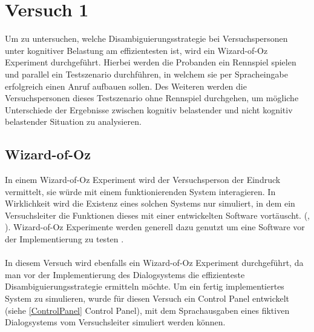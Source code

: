 \documentclass[12pt,a4paper]{scrartcl}
\begin{document}
\section{Versuch 1}
\label{versuch1}
Um zu untersuchen, welche Disambiguierungsstrategie bei Versuchspersonen unter kognitiver Belastung am effizientesten ist, wird ein Wizard-of-Oz Experiment durchgeführt. Hierbei werden die Probanden ein Rennspiel spielen und parallel ein Testszenario durchführen, in welchem sie per Spracheingabe erfolgreich einen Anruf aufbauen sollen. Des Weiteren werden die Versuchspersonen dieses Testszenario ohne Rennspiel durchgehen, um mögliche Unterschiede der Ergebnisse zwischen kognitiv belastender und nicht kognitiv belastender Situation zu analysieren. 
\subsection{Wizard-of-Oz}
\label{WOZ}
In einem Wizard-of-Oz Experiment wird der Versuchsperson der Eindruck vermittelt, sie würde mit einem funktionierenden System interagieren. In Wirklichkeit wird die Existenz eines solchen Systems nur simuliert, in dem ein Versuchsleiter die Funktionen dieses mit einer entwickelten Software vortäuscht.  (\cite{InDe}, \cite{SaLP}). Wizard-of-Oz Experimente werden generell dazu genutzt um eine Software vor der Implementierung zu testen \cite{SaLP}.\\ \\
In diesem Versuch wird ebenfalls ein Wizard-of-Oz Experiment durchgeführt, da man vor der Implementierung des Dialogsystems die effizienteste Disambiguierungsstrategie ermitteln möchte. Um ein fertig implementiertes System zu simulieren, wurde für diesen Versuch ein Control Panel entwickelt (siehe \ref{ControlPanel} Control Panel), mit dem Sprachausgaben eines fiktiven Dialogsystems vom Versuchsleiter simuliert werden können. 
\end{document}
